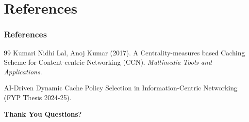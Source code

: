 \documentclass{beamer}
\begin{document}
\section{References}
\begin{frame}
  \frametitle{References}
  \begin{thebibliography}{99}
    Kumari Nidhi Lal, Anoj Kumar (2017).
    \newblock A Centrality-measures based Caching Scheme for Content-centric Networking (CCN).
    \newblock \textit{Multimedia Tools and Applications}.
    
    AI-Driven Dynamic Cache Policy Selection in Information-Centric Networking (FYP Thesis 2024-25).

  \end{thebibliography}
\end{frame}

\begin{frame}
  \centering
  \vspace*{2cm}
  \Huge\bfseries Thank You
  \vfill
  \Large Questions?
\end{frame}
\end{document}
